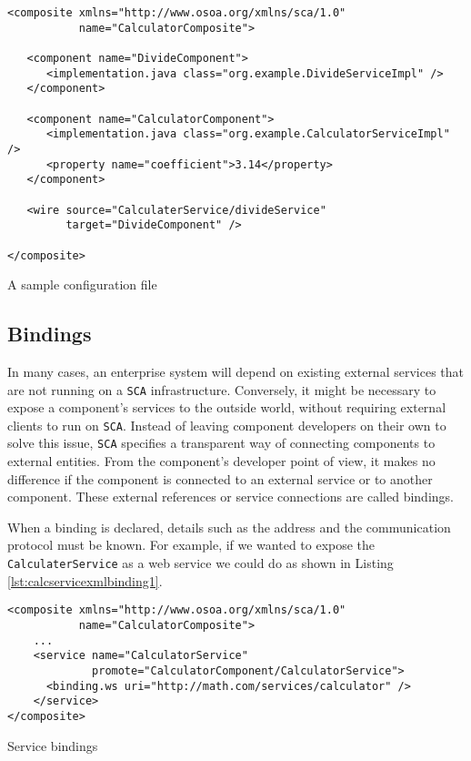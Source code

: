 \begin{listing}[!htbp]
\begin{verbatim}
<composite xmlns="http://www.osoa.org/xmlns/sca/1.0"
           name="CalculatorComposite">

   <component name="DivideComponent">
      <implementation.java class="org.example.DivideServiceImpl" />
   </component>

   <component name="CalculatorComponent">
      <implementation.java class="org.example.CalculatorServiceImpl" />
      <property name="coefficient">3.14</property>
   </component>
   
   <wire source="CalculaterService/divideService"
         target="DivideComponent" />

</composite>
\end{verbatim}
\caption{A sample configuration file}
\label{lst:calcservicexmlwires}
\end{listing}

\subsection{Bindings}

In many cases, an enterprise system will depend on existing external services that are not running on a \texttt{SCA} infrastructure.
Conversely, it might be necessary to expose a component's services to the outside world, without requiring external clients
to run on \texttt{SCA}. Instead of leaving component developers on their own to solve this issue, \texttt{SCA} specifies
a transparent way of connecting components to external entities. From the component's developer point of view, it makes
no difference if the component is connected to an external service or to another component. These external references or service
connections are called bindings.

When a binding is declared, details such as the address and the communication protocol must be known. For example, if we
wanted to expose the \texttt{CalculaterService} as a web service we could do as shown in Listing \ref{lst:calcservicexmlbinding1}.

\begin{listing}[!htbp]
\begin{verbatim}
<composite xmlns="http://www.osoa.org/xmlns/sca/1.0"
           name="CalculatorComposite">
    ...
    <service name="CalculatorService"
             promote="CalculatorComponent/CalculatorService">
      <binding.ws uri="http://math.com/services/calculator" />
    </service>
</composite>
\end{verbatim}
\caption{Service bindings}
\label{lst:calcservicexmlbinding1}
\end{listing}

